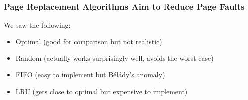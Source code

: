   \begin{frame}
    \frametitle{Page Replacement Algorithms Aim to Reduce Page Faults}

    We saw the following:
    \begin{itemize}
      \item Optimal (good for comparison but not realistic)
      \item Random (actually works surprisingly well, avoids the worst case)
      \item FIFO (easy to implement but Bélády's anomaly)
      \item LRU (gets close to optimal but expensive to implement)
    \end{itemize}
  \end{frame}


